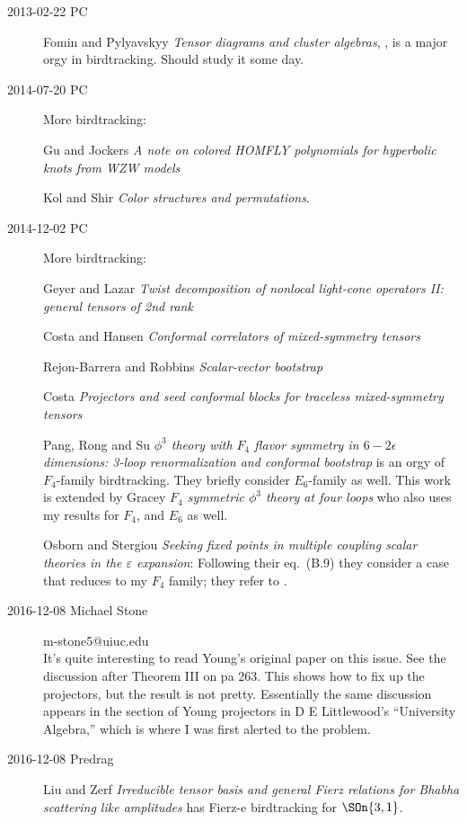 \begin{description}
\item[2013-02-22 PC] Fomin and Pylyavskyy
{\em Tensor diagrams and cluster algebras}, {},
is a major orgy in birdtracking. Should study it some day.

\item[2014-07-20 PC] More birdtracking:

Gu and Jockers
 {\em A note on colored {HOMFLY} polynomials for hyperbolic knots
      from {WZW} models}

Kol and Shir {\em Color structures and permutations}.

\item[2014-12-02 PC] More birdtracking:

Geyer and Lazar
{\em Twist decomposition of nonlocal light-cone operators
{II:} general tensors of 2nd rank}

Costa and Hansen
{\em Conformal correlators of mixed-symmetry tensors}

Rejon-Barrera and Robbins {\em Scalar-vector bootstrap}

Costa \etal{}
{\em Projectors and seed conformal blocks for traceless mixed-symmetry tensors}

Pang, Rong  and Su {\em {$\phi^3$} theory with {$F_4$} flavor
symmetry in {$6-2\epsilon$} dimensions: 3-loop renormalization and conformal
bootstrap} is an orgy of $F_4$-family birdtracking. They briefly consider
$E_6$-family as well.
This work is extended by
Gracey {\em {$F_4$} symmetric {$\phi^3$} theory at four
loops} who also uses my results for $F_4$, and $E_6$ as well.

Osborn and Stergiou {\em Seeking fixed points in multiple
coupling scalar theories in the $\varepsilon$ expansion}:
Following their eq.~(B.9) they consider a case that reduces to my $F_4$
family; they refer to .

\item[2016-12-08 Michael Stone] m-stone5@uiuc.edu
\\
It's quite interesting to read Young's original paper on this
issue. See the discussion after Theorem III on pa 263. This shows how to fix
up the projectors, but the result is not pretty. Essentially the same
discussion appears in the section of Young projectors in D E Littlewood's
``University Algebra,'' which is where I was first alerted to the problem.

\item[2016-12-08 Predrag]
Liu and Zerf {\em Irreducible tensor basis and general {Fierz}
relations for {Bhabha} scattering like amplitudes} has Fierz-e birdtracking for
$\SOn{3,1}$.


\end{description}
